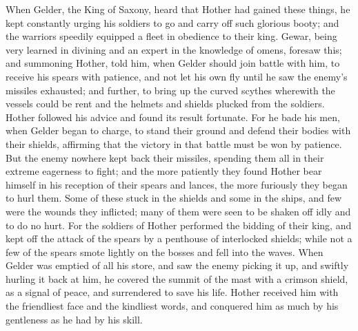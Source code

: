 \documentclass[10pt,a4paper]{report}
\begin{document}
When Gelder, the King of Saxony, heard that Hother had gained these things, he kept constantly urging his soldiers to go and carry off such glorious booty; and the warriors speedily equipped a fleet in obedience to their king. Gewar, being very learned in divining and an expert in the knowledge of omens, foresaw this; and summoning Hother, told him, when Gelder should join battle with him, to receive his spears with patience, and not let his own fly until he saw the enemy's missiles exhausted; and further, to bring up the curved scythes wherewith the vessels could be rent and the helmets and shields plucked from the soldiers. Hother followed his advice and found its result fortunate. For he bade his men, when Gelder began to charge, to stand their ground and defend their bodies with their shields, affirming that the victory in that battle must be won by patience. But the enemy nowhere kept back their missiles, spending them all in their extreme eagerness to fight; and the more patiently they found Hother bear himself in his reception of their spears and lances, the more furiously they began to hurl them. Some of these stuck in the shields and some in the ships, and few were the wounds they inflicted; many of them were seen to be shaken off idly and to do no hurt. For the soldiers of Hother performed the bidding of their king, and kept off the attack of the spears by a penthouse of interlocked shields; while not a few of the spears smote lightly on the bosses and fell into the waves. When Gelder was emptied of all his store, and saw the enemy picking it up, and swiftly hurling it back at him, he covered the summit of the mast with a crimson shield, as a signal of peace, and surrendered to save his life. Hother received him with the friendliest face and the kindliest words, and conquered him as much by his gentleness as he had by his skill.\\
\end{document}
